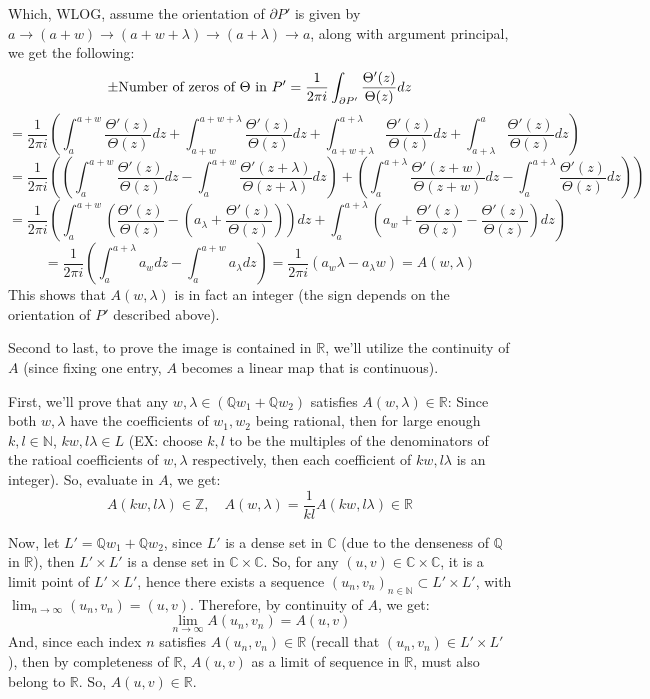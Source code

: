 \documentclass{article}
\begin{document}
\begin{itemize}
\begin{itemize}
        Which, WLOG, assume the orientation of $\partial P'$ is given by $a\rightarrow (a+w)\rightarrow (a+w+\lambda)\rightarrow (a+\lambda)\rightarrow a$, along with argument principal, we get the following:
        $$\pm\textmd{Number of zeros of } \Theta \textmd{ in } P' = \frac{1}{2\pi i}\int_{\partial P'}\frac{\Theta'(z)}{\Theta(z)}dz$$
        $$ = \frac{1}{2\pi i}\left(\int_{a}^{a+w}\frac{\Theta'(z)}{\Theta(z)}dz+\int_{a+w}^{a+w+\lambda}\frac{\Theta'(z)}{\Theta(z)}dz+\int_{a+w+\lambda}^{a+\lambda}\frac{\Theta'(z)}{\Theta(z)}dz+\int_{a+\lambda}^{a}\frac{\Theta'(z)}{\Theta(z)}dz\right)$$
        $$=\frac{1}{2\pi i}\left(\left(\int_{a}^{a+w}\frac{\Theta'(z)}{\Theta(z)}dz - \int_{a}^{a+w}\frac{\Theta'(z+\lambda)}{\Theta(z+\lambda)}dz\right)+\left(\int_{a}^{a+\lambda}\frac{\Theta'(z+w)}{\Theta(z+w)}dz - \int_{a}^{a+\lambda}\frac{\Theta'(z)}{\Theta(z)}dz\right)\right)$$
        $$=\frac{1}{2\pi i}\left(\int_{a}^{a+w}\left(\frac{\Theta'(z)}{\Theta(z)}-\left(a_\lambda+\frac{\Theta'(z)}{\Theta(z)}\right)\right)dz + \int_{a}^{a+\lambda}\left(a_w+\frac{\Theta'(z)}{\Theta(z)}-\frac{\Theta'(z)}{\Theta(z)}\right)dz\right)$$
        $$ = \frac{1}{2\pi i}\left(\int_{a}^{a+\lambda}a_wdz - \int_{a}^{a+w}a_\lambda dz\right) = \frac{1}{2\pi i}(a_w\lambda - a_\lambda w) = A(w,\lambda)$$
        This shows that $A(w,\lambda)$ is in fact an integer (the sign depends on the orientation of $P'$ described above).
    \end{itemize}

    Second to last, to prove the image is contained in $\mathbb{R}$, we'll utilize the continuity of $A$ (since fixing one entry, $A$ becomes a linear map that is continuous). 

    First, we'll prove that any $w,\lambda\in(\mathbb{Q}w_1+\mathbb{Q}w_2)$ satisfies $A(w,\lambda) \in\mathbb{R}$: Since both $w,\lambda$ have the coefficients of $w_1,w_2$ being rational, then for large enough $k,l\in\mathbb{N}$, $kw,l\lambda\in L$ (EX: choose $k,l$ to be the multiples of the denominators of the ratioal coefficients of $w,\lambda$ respectively, then each coefficient of $kw,l\lambda$ is an integer).
    So, evaluate in $A$, we get:
    $$A(kw,l\lambda)\in\mathbb{Z},\quad A(w,\lambda) = \frac{1}{kl}A(kw,l\lambda) \in\mathbb{R}$$
    
    Now, let $L' = \mathbb{Q}w_1+\mathbb{Q}w_2$, since $L'$ is a dense set in $\mathbb{C}$ (due to the denseness of $\mathbb{Q}$ in $\mathbb{R}$), then $L'\times L'$ is a dense set in $\mathbb{C}\times \mathbb{C}$. So, for any $(u,v)\in\mathbb{C}\times \mathbb{C}$, it is a limit point of $L'\times L'$, hence there exists a sequence $(u_n,v_n)_{n\in\mathbb{N}}\subset L'\times L'$, with $\lim_{n\rightarrow\infty}(u_n,v_n) = (u,v)$. Therefore, by continuity of $A$, we get:
    $$\lim_{n\rightarrow\infty}A(u_n,v_n) = A(u,v)$$
    And, since each index $n$ satisfies $A(u_n,v_n)\in \mathbb{R}$ (recall that $(u_n,v_n)\in L'\times L'$), then by completeness of $\mathbb{R}$, $A(u,v)$ as a limit of sequence in $\mathbb{R}$, must also belong to $\mathbb{R}$. So, $A(u,v)\in\mathbb{R}$.


\end{itemize}
\end{document}
